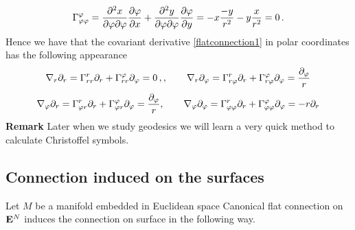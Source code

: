 \documentclass[12pt]{article}
\theoremstyle{theorem}
\numberwithin{equation}{section}
\begin{document}
             \begin{equation}\label{clhristoffelsymbolsinpolarcoordinates2}
                \Gamma^\varphi_{\varphi\varphi}=
        {\partial^2 x\over \partial \varphi\partial \varphi}{\partial \varphi\over \partial x}+
        {\partial^2 y\over \partial \varphi\partial \varphi}{\partial \varphi\over \partial y}=
        -x{-y\over r^2}-y{x\over r^2}=0\,.
                     \end{equation}
       Hence  we have that the covariant derivative \eqref{flatconnection1}
        in polar coordinates has the following appearance
                  \begin{equation*}
                  \nabla_r \partial_r=
                  \Gamma_{rr}^r\partial_r+
                  \Gamma_{rr}^\varphi\partial_\varphi=0\,,
                  , \qquad
                  \nabla_r\partial_\varphi=\Gamma_{r\varphi}^r\partial_r+
                  \Gamma_{r\varphi}^\varphi\partial_\varphi={\partial_\varphi\over r}
                  \end{equation*}
                  \begin{equation}\label{covariantderivativeinpolarcoordinates}
                  \nabla_\varphi \partial_r=
                  \Gamma_{\varphi r}^r\partial_r+
                  \Gamma_{\varphi r}^\varphi\partial_\varphi={\partial_\varphi\over r}, \qquad
                  \nabla_\varphi\partial_\varphi=\Gamma_{\varphi\varphi}^r\partial_r+
                  \Gamma_{\varphi\varphi}^\varphi\partial_\varphi=-r\partial_r
                  \end{equation}
{\bf Remark}  Later when we study geodesics we will learn a very quick method to calculate
Christoffel symbols.



\subsection {Connection induced on the surfaces}

   Let $M$ be a manifold embedded in 
 Euclidean space%
    Canonical flat connection on ${\bf E}^N$  induces the 
connection on surface in the following way.
\end{document}
